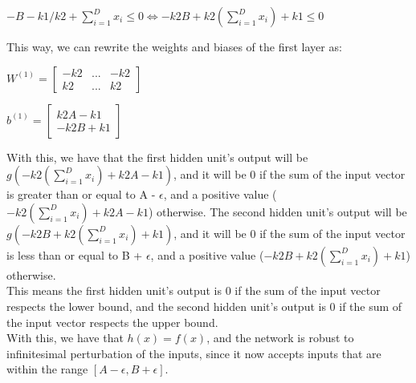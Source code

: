 \documentclass{article}
\begin{document}
$ -B - k1/k2 + \sum_{i=1}^{D} x_i \leq 0 \iff -k2B + k2(\sum_{i=1}^{D} x_i) + k1 \leq 0$

This way, we can rewrite the weights and biases of the first layer as:

\( W^{(1)} = \begin{bmatrix}
    -k2 & ...  & -k2\\
    k2 & ... & k2
\end{bmatrix}
\)

\(b^{(1)} = \begin{bmatrix}
    k2A - k1 \\
    -k2B + k1
\end{bmatrix}
\)

With this, we have that the first hidden unit's output will be $g(-k2(\sum_{i=1}^{D} x_i) + k2A - k1)$, and it will be 0 if the sum of the 
input vector is greater than or equal to A - $\epsilon$, and a positive value ($-k2(\sum_{i=1}^{D} x_i) + k2A - k1$) otherwise. 
The second hidden unit's output will be $g(-k2B + k2(\sum_{i=1}^{D} x_i) + k1)$, and it will be 0 if the sum of the input vector is less than or equal 
to B + $\epsilon$, and a positive value ($-k2B + k2(\sum_{i=1}^{D} x_i) + k1$) otherwise. \\
This means the first hidden unit's output is 0 if the sum of the input vector respects the lower bound,
and the second hidden unit's output is 0 if the sum of the input vector respects the upper bound. \\
With this, we have that \(h(x) = f(x)\), and the network is robust to infinitesimal perturbation of the inputs, since it now accepts inputs
that are within the range \([A - \epsilon, B + \epsilon]\).
\end{document}
